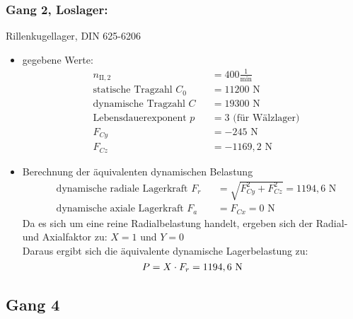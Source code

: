 \subsubsection{Gang 2, Loslager:} Rillenkugellager, DIN 625-6206\\
\begin{itemize}
	\item gegebene Werte:
	\begin{align*}
	&n_{{\mathord{\mathrm{II}},2}} &&=  400 \frac{1}{\text{min}} \\
	&\text{statische Tragzahl } C_{0} &&= 11200 \text{ N}\\
	&\text{dynamische Tragzahl } C &&= 19300 \text{ N} \\
	&\text{Lebensdauerexponent } p &&= 3 \text{ (für Wälzlager)} \\
	&F_{Cy} && = -245 \text{ N}\\
	&F_{Cz} && =-1169,2 \text{ N}
	\end{align*} 
	\item Berechnung der äquivalenten dynamischen Belastung
	\begin{align*}
	&\text{dynamische radiale Lagerkraft } F_r&& = \sqrt{F_{Cy}^2 + F_{Cz}^2 } =1194,6 \text{ N} \\
	&\text{dynamische axiale Lagerkraft } F_a&& = F_{Cx} = 0\text{ N}
	\end{align*} 
	Da es sich um eine reine Radialbelastung handelt, ergeben sich der Radial- und Axialfaktor zu: $X= 1$ und $Y=0$\\
	Daraus ergibt sich die äquivalente dynamische Lagerbelastung zu:  
	\[
	P= X \cdot F_r =1194,6 \text{ N}
	\]
\end{itemize}
\newpage

\subsection{Gang 4}
